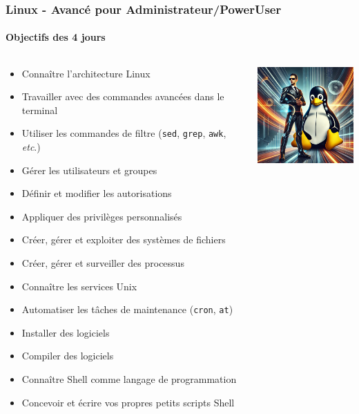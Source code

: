 \documentclass{beamer}
\begin{document}
    \begin{frame}
        \frametitle{Linux - Avancé pour Administrateur/PowerUser}
        \framesubtitle{Objectifs des 4 jours}
        \transdissolve
        \begin{columns}
            \begin{scriptsize}
                \begin{itemize}
                    \item Connaître l'architecture Linux
                    \item Travailler avec des commandes avancées dans le terminal
                    \item Utiliser les commandes de filtre (\lstinline{sed}, \lstinline{grep}, \lstinline{awk}, \textit{etc}.)
                    \item Gérer les utilisateurs et groupes
                    \item Définir et modifier les autorisations
                    \item Appliquer des privilèges personnalisés
                    \item Créer, gérer et exploiter des systèmes de fichiers
                    \item Créer, gérer et surveiller des processus
                    \item Connaître les services Unix
                    \item Automatiser les tâches de maintenance (\lstinline{cron}, \lstinline{at})
                    \item Installer des logiciels
                    \item Compiler des logiciels
                    \item Connaître Shell comme langage de programmation
                    \item Concevoir et écrire vos propres petits scripts Shell
                \end{itemize}
            \end{scriptsize}
            \includegraphics[width=4cm]{image/IT-man-and-penguin}
        \end{columns}
    \end{frame}
\end{document}
